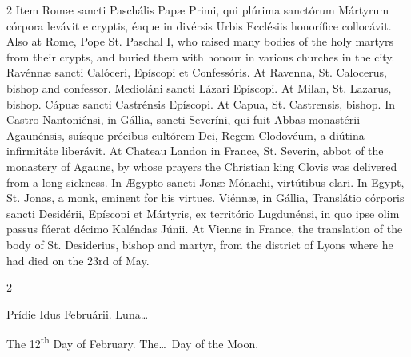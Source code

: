 \begin{paracol}{2}
\switchcolumn*
{}
Item Romæ sancti Paschális Papæ Primi, qui 
 plúrima sanctórum Mártyrum córpora levávit e cryptis, éaque in divérsis 
 Urbis Ecclésiis honorífice collocávit.
\switchcolumn
{}
Also at Rome, Pope St. Paschal I, who raised many bodies of the holy martyrs 
 from their crypts, and buried them with honour in various churches in the 
 city.
\switchcolumn*
{}
Ravénnæ sancti Calóceri, Epíscopi et 
 Confessóris.
\switchcolumn
{}
At Ravenna, St. Calocerus, bishop and confessor.
\switchcolumn*
{}
Medioláni sancti Lázari Epíscopi.
\switchcolumn
{}
At Milan, St. Lazarus, bishop.
\switchcolumn*
{}
Cápuæ sancti Castrénsis Epíscopi.
\switchcolumn
{}
At Capua, St. Castrensis, bishop.
\switchcolumn*
{}
In Castro Nantoniénsi, in Gállia, sancti Severíni, qui fuit Abbas monastérii 
 Agaunénsis, suísque précibus cultórem Dei, Regem Clodovéum, 
 a diútina infirmitáte liberávit.
\switchcolumn
{}
At Chateau Landon in France, St. Severin, abbot of the monastery of Agaune, 
 by whose prayers the Christian king Clovis was delivered from a long 
 sickness.
\switchcolumn*
{}
In Ægypto sancti Jonæ Mónachi, virtútibus clari.
\switchcolumn
{}
In Egypt, St. Jonas, a monk, eminent for his virtues.
\switchcolumn*
{}
Viénnæ, in Gállia, Translátio córporis sancti 
 Desidérii, Epíscopi et Mártyris, ex território Lugdunénsi, in quo ipse olim 
 passus fúerat décimo Kaléndas Júnii.
\switchcolumn
{}
At Vienne in France, the translation of the body of St. Desiderius, bishop 
 and martyr, from the district of Lyons where he had died on the 23rd of May.
\switchcolumn*
{}
\end{paracol}


\begin{paracol}{2}
\begin{center}{\color{gregoriocolor} Prídie Idus Februárii. 
 Luna\dots\ }\end{center}
\switchcolumn
{}
\begin{center}{\color{gregoriocolor} The 12\textsuperscript{th} Day of 
 February. The\dots\ Day of the Moon.}\end{center}
\end{paracol}

